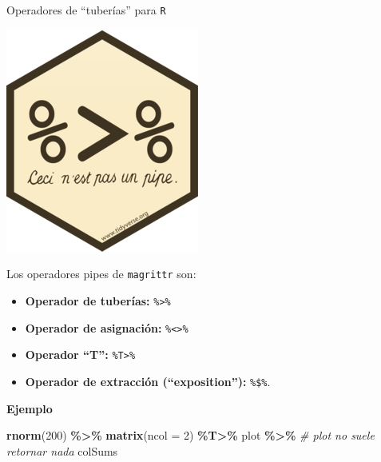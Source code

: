 \documentclass[
  ignorenonframetext,
  aspectratio=169]{beamer}
\newenvironment{Shaded}{\begin{snugshade}}{\end{snugshade}}
\newcommand{\AttributeTok}[1]{\textcolor[rgb]{0.13,0.29,0.53}{#1}}
\newcommand{\CommentTok}[1]{\textcolor[rgb]{0.56,0.35,0.01}{\textit{#1}}}
\newcommand{\DecValTok}[1]{\textcolor[rgb]{0.00,0.00,0.81}{#1}}
\newcommand{\FunctionTok}[1]{\textcolor[rgb]{0.13,0.29,0.53}{\textbf{#1}}}
\newcommand{\NormalTok}[1]{#1}
\newcommand{\SpecialCharTok}[1]{\textcolor[rgb]{0.81,0.36,0.00}{\textbf{#1}}}
\providecommand{\tightlist}{%
  \setlength{\itemsep}{0pt}\setlength{\parskip}{0pt}}
\begin{document}
\begin{frame}[fragile]{Operadores de ``tuberías'' para \texttt{R}}
\label{operadores-de-tuberuxedas-para-r}
\begin{flushright}\includegraphics[width=0.05\linewidth]{Imgs/logo_pipe} \end{flushright}

Los operadores pipes de \texttt{magrittr} son:

\begin{itemize}
\tightlist
\item
  \textbf{Operador de tuberías:} \texttt{\%\textgreater{}\%}
\item
  \textbf{Operador de asignación:}
  \texttt{\%\textless{}\textgreater{}\%}
\item
  \textbf{Operador ``T'':} \texttt{\%T\textgreater{}\%}
\item
  \textbf{Operador de extracción (``exposition''):} \texttt{\%\$\%}.
\end{itemize}

\textbf{Ejemplo}

\begin{Shaded}
\begin{Highlighting}[]
\FunctionTok{rnorm}\NormalTok{(}\DecValTok{200}\NormalTok{) }\SpecialCharTok{\%\textgreater{}\%}
\FunctionTok{matrix}\NormalTok{(}\AttributeTok{ncol =} \DecValTok{2}\NormalTok{) }\SpecialCharTok{\%T\textgreater{}\%}
\NormalTok{plot }\SpecialCharTok{\%\textgreater{}\%} \CommentTok{\# plot no suele retornar nada}
\NormalTok{colSums}
\end{Highlighting}
\end{Shaded}
\end{frame}
\end{document}
